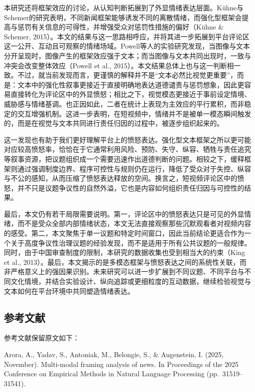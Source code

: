 \documentclass[
]{article}
\begin{document}
本研究还将框架效应的讨论，从认知判断拓展到了外显情绪表达层面。Kühne与Schemer的研究表明，不同新闻框架能够诱发不同的离散情绪，而强化型框架会提高与惩罚有关信息的可得性，并增强受众对惩罚性措施的偏好（Kühne
\& Schemer,
2015）。本文的结果与这一思路相呼应，并将其进一步拓展到平台评论区这一公开、互动且可观察的情绪场域。Powell等人的实验研究发现，当图像与文本分开呈现时，图像产生的框架效应强于文本；而当图像与文本共同出现时，一致与冲突会改变整体效应（Powell
et al.,
2015）。本文结果总体上也与这一判断相一致。不过，就当前发现而言，更谨慎的解释并不是``文本必然比视觉更重要''，而是：文本中的强化性叙事更接近于直接明确地表达道德谴责与惩罚想象，因此更容易直接转化为评论区中的外显愤怒；相比之下，视觉模态更接近于事前设定情境、威胁感与情绪基调。也正因如此，二者在统计上表现为主效应的平行累积，而非稳定的交互增强机制。这进一步表明，在短视频中，情绪并不是被单一模态瞬间触发的，而是在视觉与文本共同进行责任归因的过程中，被逐步组织起来的。

这一发现也有助于我们更好理解平台上的愤怒表达。强化型文本框架之所以更可能对应较高愤怒率，恰恰在于它通常利用风险、预防、失守、纵容、牺牲与责任追究等叙事资源，把议题组织成一个需要迅速作出道德判断的问题。相较之下，缓释框架则通过强调制度边界、程序可控性与规则仍在运行，降低了受众对于失控、纵容与不公的感知，从而压缩了愤怒表达释放的空间。换言之，短视频评论区中的愤怒，并不只是议题争议性的自然外溢，它也是内容如何组织责任归因与可控性的结果。

最后，本文仍有若干局限需要说明。第一，评论区中的愤怒表达只是可见的外显情绪，而不是受众全部内部情绪状态，本文无法直接观察那些沉默观看者对视频内容的感受。第二，本文聚焦于单一议题和特定时间窗口，因此当前结论更适合作为一个关于高度争议性治理议题的经验发现，而不是适用于所有公共议题的一般规律。同时，由于中国审查制度的限制，本研究的数据收集也受到相当大的约束（King
et al.,
2013）。最后，本文揭示的是多模态框架与愤怒表达之间的系统性关联，而非严格意义上的强因果识别。未来研究可以进一步扩展到不同议题、不同平台与不同文化情境，并结合实验设计、纵向追踪或更细粒度的互动数据，继续检验视觉与文本如何在平台环境中共同塑造情绪表达。

\subsection{参考文献}\label{ux53c2ux8003ux6587ux732e}

参考文献保留原文如下：

Arora, A., Yadav, S., Antoniak, M., Belongie, S., \& Augenstein, I.
(2025, November). Multi-modal framing analysis of news. In Proceedings
of the 2025 Conference on Empirical Methods in Natural Language
Processing (pp.~31519--31541).
\end{document}
